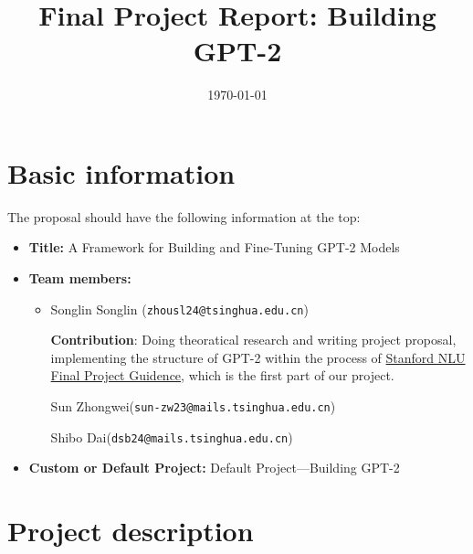 \documentclass{article}
\title{Final Project Report: Building GPT-2}
\date{\today}
\theoremstyle{definition}
\begin{document}
    \maketitle
    \tableofcontents
  \section{Basic information}


  The proposal should have the following information at the top:
  \begin{itemize}
    \item \textbf{Title:} A Framework for Building and Fine-Tuning GPT-2 Models
    \item \textbf{Team members:} 
    \begin{itemize}
      \item Songlin Songlin (\texttt{zhousl24@tsinghua.edu.cn})
      
      \textbf{Contribution}: Doing theoratical research and writing project proposal, 
implementing the structure of GPT-2 within the process of
\href{https://github.com/AGIXLab/NLU-Course-Project-GPT-and-Downstream-Tasks/tree/main}{Stanford NLU Final Project Guidence},
which is the first part of our project.


      Sun Zhongwei(\texttt{sun-zw23@mails.tsinghua.edu.cn})

      Shibo Dai(\texttt{dsb24@mails.tsinghua.edu.cn})
    \end{itemize}
    \item \textbf{Custom or Default Project:} 
      Default Project---Building GPT-2
  \end{itemize}
  





  



  \section{Project description}
\end{document}
